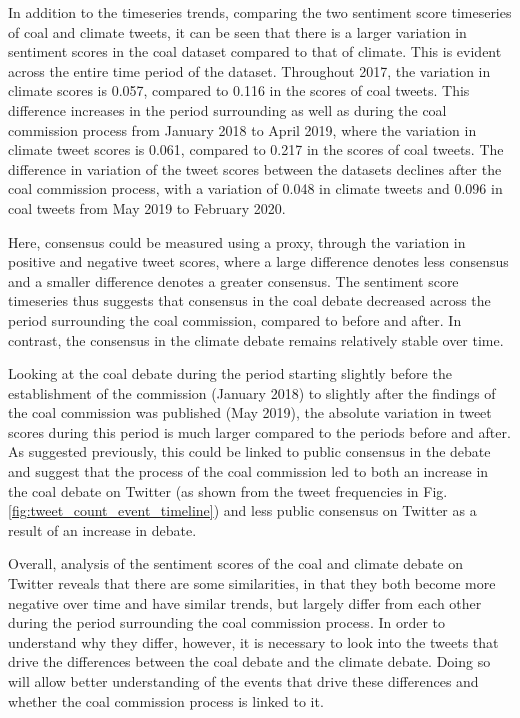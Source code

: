 \documentclass[12pt,onecolumn,twoside]{layout}
\begin{document}
In addition to the timeseries trends, comparing the two sentiment score timeseries of coal and climate tweets, it can be seen that there is a larger variation in sentiment scores in the coal dataset compared to that of climate. This is evident across the entire time period of the dataset. Throughout 2017, the variation in climate scores is 0.057, compared to 0.116 in the scores of coal tweets. This difference increases in the period surrounding as well as during the coal commission process from January 2018 to April 2019, where the variation in climate tweet scores is 0.061, compared to 0.217 in the scores of coal tweets. The difference in variation of the tweet scores between the datasets declines after the coal commission process, with a variation of 0.048 in climate tweets and 0.096 in coal tweets from May 2019 to February 2020. 


Here, consensus could be measured using a proxy, through the variation in positive and negative tweet scores, where a large difference denotes less consensus and a smaller difference denotes a greater consensus. The sentiment score timeseries thus suggests that consensus in the coal debate decreased across the period surrounding the coal commission, compared to before and after. In contrast, the consensus in the climate debate remains relatively stable over time. 

Looking at the coal debate during the period starting slightly before the establishment of the commission (January 2018) to slightly after the findings of the coal commission was published (May 2019), the absolute variation in tweet scores during this period is much larger compared to the periods before and after. As suggested previously, this could be linked to public consensus in the debate and suggest that the process of the coal commission led to both an increase in the coal debate on Twitter (as shown from the tweet frequencies in Fig. \ref{fig:tweet_count_event_timeline}) and less public consensus on Twitter as a result of an increase in debate. 

Overall, analysis of the sentiment scores of the coal and climate debate on Twitter reveals that there are some similarities, in that they both become more negative over time and have similar trends, but largely differ from each other during the period surrounding the coal commission process. In order to understand why they differ, however, it is necessary to look into the tweets that drive the differences between the coal debate and the climate debate. Doing so will allow better understanding of the events that drive these differences and whether the coal commission process is linked to it. 
\end{document}
